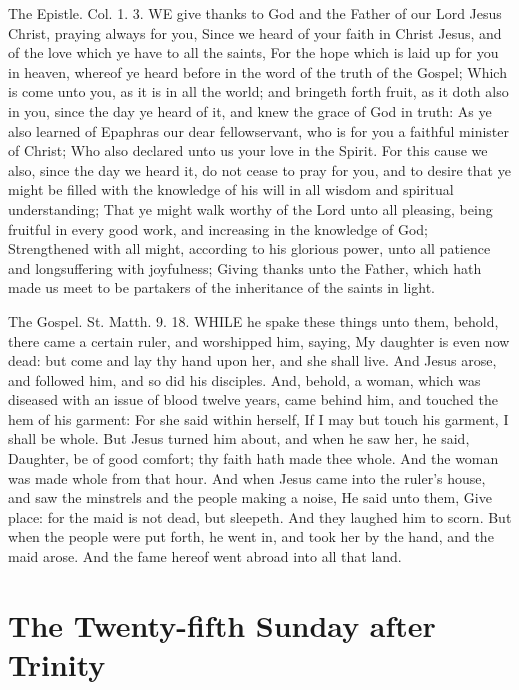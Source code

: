 The Epistle. Col. 1. 3.
WE give thanks to God and the Father of our Lord Jesus Christ, praying always for you, Since we heard of your faith in Christ Jesus, and of the love which ye have to all the saints, For the hope which is laid up for you in heaven, whereof ye heard before in the word of the truth of the Gospel; Which is come unto you, as it is in all the world; and bringeth forth fruit, as it doth also in you, since the day ye heard of it, and knew the grace of God in truth: As ye also learned of Epaphras our dear fellowservant, who is for you a faithful minister of Christ; Who also declared unto us your love in the Spirit. For this cause we also, since the day we heard it, do not cease to pray for you, and to desire that ye might be filled with the knowledge of his will in all wisdom and spiritual understanding; That ye might walk worthy of the Lord unto all pleasing, being fruitful in every good work, and increasing in the knowledge of God; Strengthened with all might, according to his glorious power, unto all patience and longsuffering with joyfulness; Giving thanks unto the Father, which hath made us meet to be partakers of the inheritance of the saints in light.


The Gospel. St. Matth. 9. 18.
WHILE he spake these things unto them, behold, there came a certain ruler, and worshipped him, saying, My daughter is even now dead: but come and lay thy hand upon her, and she shall live. And Jesus arose, and followed him, and so did his disciples. And, behold, a woman, which was diseased with an issue of blood twelve years, came behind him, and touched the hem of his garment: For she said within herself, If I may but touch his garment, I shall be whole. But Jesus turned him about, and when he saw her, he said, Daughter, be of good comfort; thy faith hath made thee whole. And the woman was made whole from that hour. And when Jesus came into the ruler's house, and saw the minstrels and the people making a noise, He said unto them, Give place: for the maid is not dead, but sleepeth. And they laughed him to scorn. But when the people were put forth, he went in, and took her by the hand, and the maid arose. And the fame hereof went abroad into all that land.

\section{The Twenty-fifth Sunday after Trinity}
\subsection{}

